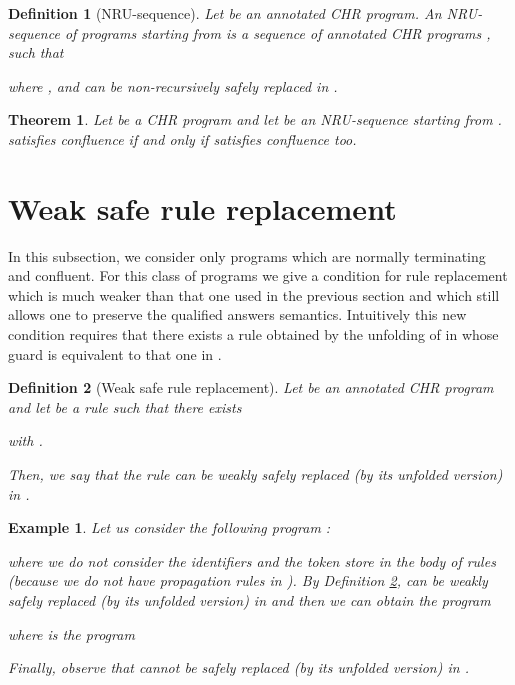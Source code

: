 \documentclass{tlp}
\newtheorem{definition}{Definition} \newtheorem{proposition}{Proposition} \newtheorem{example}{Example} \newtheorem{corollary}{Corollary} \newtheorem{theorem}{Theorem} \newtheorem{lemma}{Lemma}
\begin{document}
\begin{definition}[{\sc NRU-sequence}]\label{def:nruno}
Let  be an annotated CHR program. An \emph{NRU-sequence} of programs
starting from  is a sequence of annotated CHR programs , such that

 where ,  and can be non-recursively safely replaced in .
\end{definition}

\begin{theorem} Let  be a CHR program and let 
be an NRU-sequence starting from .  satisfies confluence if and only if 
satisfies confluence too.
\end{theorem}


\section{Weak safe rule replacement}\label{sec:normally -rep}
In this subsection, we consider only programs which are normally terminating and confluent.
For this class of programs we give a condition for rule replacement which is much weaker than that one used in the previous section and which still allows one to preserve the qualified answers semantics. Intuitively this new condition requires that there exists a rule obtained by the unfolding of  in  whose guard is equivalent to that one in .

\begin{definition}[{\sc Weak safe rule replacement}]\label{def:wsafedel}
Let  be an annotated CHR program and let  be a rule such that there exists

with .

Then, we say that the rule 
can be weakly safely replaced (by its unfolded version) in .
\end{definition}



\begin{example}\label{ex:ncofluence}
Let us consider the following program :

where we do not consider the identifiers and the token store in the
body of rules (because we do not have propagation rules in ).
By Definition \ref{def:wsafedel},  can be weakly safely replaced (by its unfolded version) in  and then we can obtain the program

   where  is the program

Finally, observe that  cannot be safely replaced (by its unfolded version) in .
\end{example}
\end{document}
